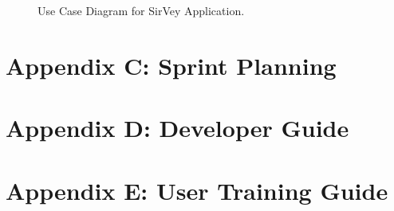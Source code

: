 \documentclass[12pt]{witseiepaper}
\begin{document}
\begin{figure}[H]
	\caption{Use Case Diagram for SirVey Application.} 
	\label{fig:UseCase}
\end{figure}

\newpage
\section{Appendix C: Sprint Planning}



\newpage
\section{Appendix D: Developer Guide}


\newpage
\section{Appendix E: User Training Guide}

\end{document}
